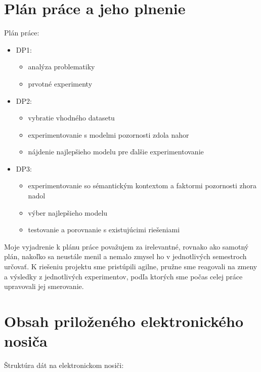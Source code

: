
\newpage
\pagestyle{plain}

\section{Plán práce a jeho plnenie}

Plán práce:

\begin{itemize}
	\item DP1:
		\begin{itemize}
			\item analýza problematiky
			\item prvotné experimenty
		\end{itemize}
	\item DP2:
		\begin{itemize}
			\item vybratie vhodného datasetu
			\item experimentovanie s modelmi pozornosti zdola nahor
			\item nájdenie najlepšieho modelu pre ďalšie experimentovanie
		\end{itemize}
	\item DP3:
		\begin{itemize}
			\item experimentovanie so sémantickým kontextom a faktormi pozornosti zhora nadol
			\item výber najlepšieho modelu
			\item testovanie a porovnanie s existujúcimi riešeniami
		\end{itemize}
\end{itemize}

Moje vyjadrenie k plánu práce považujem za irelevantné, rovnako ako samotný plán, nakoľko sa neustále menil a nemalo zmysel ho v jednotlivých semestroch určovať. K riešeniu projektu sme pristúpili agilne, pružne sme reagovali na zmeny a výsledky z jednotlivých experimentov, podľa ktorých sme počas celej práce upravovali jej smerovanie. 
\newpage
\null
\thispagestyle{empty}
\newpage
\section{Obsah priloženého elektronického nosiča}

Štruktúra dát na elektronickom nosiči:

